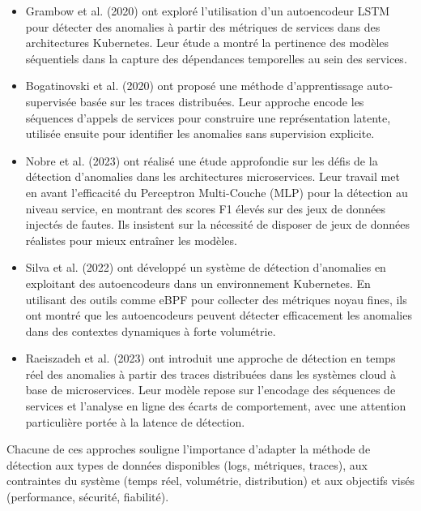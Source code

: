 \documentclass[conference]{IEEEtran}
\begin{document}
\begin{itemize}
\item Grambow et al. \cite{grambow2020} (2020) ont exploré l’utilisation d’un autoencodeur LSTM pour détecter des anomalies à partir des métriques de services dans des architectures Kubernetes. Leur étude a montré la pertinence des modèles séquentiels dans la capture des dépendances temporelles au sein des services.

\item Bogatinovski et al. \cite{bogatinovski2020} (2020) ont proposé une méthode d’apprentissage auto-supervisée basée sur les traces distribuées. Leur approche encode les séquences d’appels de services pour construire une représentation latente, utilisée ensuite pour identifier les anomalies sans supervision explicite.

\item Nobre et al. \cite{nobre2023} (2023) ont réalisé une étude approfondie sur les défis de la détection d’anomalies dans les architectures microservices. Leur travail met en avant l’efficacité du Perceptron Multi-Couche (MLP) pour la détection au niveau service, en montrant des scores F1 élevés sur des jeux de données injectés de fautes. Ils insistent sur la nécessité de disposer de jeux de données réalistes pour mieux entraîner les modèles.

\item Silva et al. \cite{silva2022_auto_encodeur} (2022) ont développé un système de détection d’anomalies en exploitant des autoencodeurs dans un environnement Kubernetes. En utilisant des outils comme eBPF pour collecter des métriques noyau fines, ils ont montré que les autoencodeurs peuvent détecter efficacement les anomalies dans des contextes dynamiques à forte volumétrie.

\item Raeiszadeh et al. \cite{Raeiszadeh2023} (2023) ont introduit une approche de détection en temps réel des anomalies à partir des traces distribuées dans les systèmes cloud à base de microservices. Leur modèle repose sur l’encodage des séquences de services et l’analyse en ligne des écarts de comportement, avec une attention particulière portée à la latence de détection.

\end{itemize}

Chacune de ces approches souligne l’importance d’adapter la méthode de détection aux types de données disponibles (logs, métriques, traces), aux contraintes du système (temps réel, volumétrie, distribution) et aux objectifs visés (performance, sécurité, fiabilité).
\end{document}

